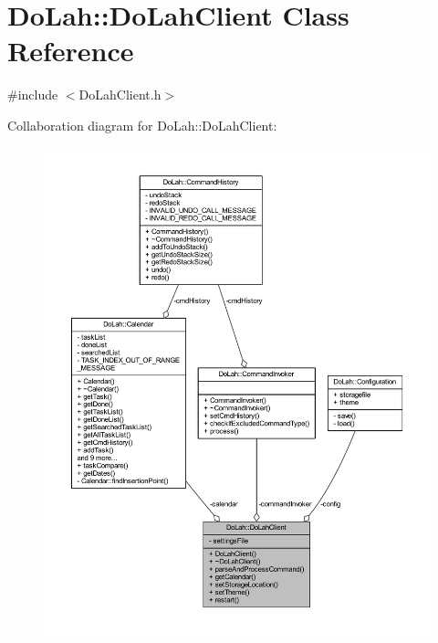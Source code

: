 \hypertarget{class_do_lah_1_1_do_lah_client}{}\section{Do\+Lah\+:\+:Do\+Lah\+Client Class Reference}
\label{class_do_lah_1_1_do_lah_client}


{\ttfamily \#include $<$Do\+Lah\+Client.\+h$>$}



Collaboration diagram for Do\+Lah\+:\+:Do\+Lah\+Client\+:
\nopagebreak
\begin{figure}[H]
\begin{center}
\leavevmode
\includegraphics[width=350pt]{class_do_lah_1_1_do_lah_client__coll__graph}
\end{center}
\end{figure}
